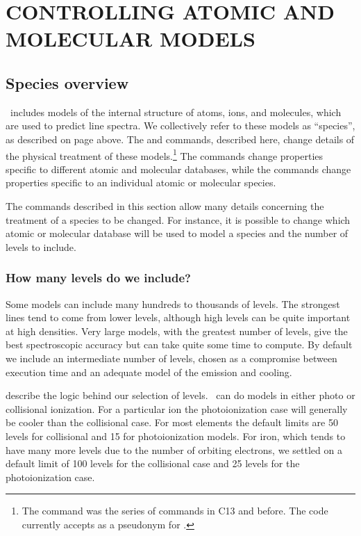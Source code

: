 \chapter{CONTROLLING ATOMIC AND MOLECULAR MODELS}
\label{sec:ControllingAtomicModels}

\section{Species overview}

\Cloudy\ includes models of the internal structure of atoms, ions, and molecules,
which are used to predict line spectra.
We collectively refer to these models as ``species'', as described on page
\pageref{sec:SpeciesDefine} above.
The  and  commands, described here,
change details of the physical treatment of these 
models.\footnote{The  command was the 
 series of commands in C13 and before.  
The code currently accepts  as a
pseudonym for .}  The  commands change
properties specific to different atomic and molecular databases, while the 
commands change properties specific to an individual atomic or molecular species.

The commands described in this section allow many details concerning the treatment
of a species to be changed. 
For instance, it is possible to change which atomic or molecular database will be used to model a species
and the number of levels to include.

\subsection{How many levels do we include?}
Some models can include many hundreds to thousands of levels.
The strongest lines tend to come from lower levels, although
high levels can be quite important at high densities.
Very large models, with the greatest number of levels, give the best spectroscopic accuracy
but can take quite some time to compute.
By default we include an intermediate number of levels,
chosen as a compromise between execution time and 
an adequate model of the emission and cooling.

\citet{2013MNRAS.429.3133L} describe the logic behind our selection of levels.  
\Cloudy\ can do models in either photo or collisional ionization.
For a particular ion the photoionization case will generally be cooler than the collisional case.
For most elements the default limits are 50 levels for collisional and 15 for photoionization models.  
For iron, which tends to have many more levels due to the number of orbiting electrons,
we settled on a default limit of 100 levels for the collisional case 
and 25 levels for the photoionization case.  

